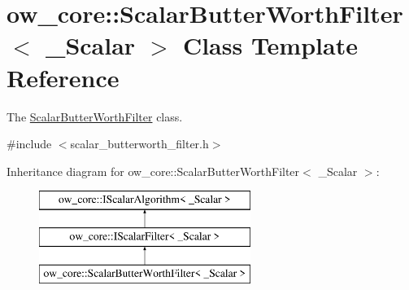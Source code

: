 \hypertarget{classow__core_1_1ScalarButterWorthFilter}{}\section{ow\+\_\+core\+:\+:Scalar\+Butter\+Worth\+Filter$<$ \+\_\+\+Scalar $>$ Class Template Reference}
\label{classow__core_1_1ScalarButterWorthFilter}


The \hyperlink{classow__core_1_1ScalarButterWorthFilter}{Scalar\+Butter\+Worth\+Filter} class.  




{\ttfamily \#include $<$scalar\+\_\+butterworth\+\_\+filter.\+h$>$}

Inheritance diagram for ow\+\_\+core\+:\+:Scalar\+Butter\+Worth\+Filter$<$ \+\_\+\+Scalar $>$\+:\begin{figure}[H]
\begin{center}
\leavevmode
\includegraphics[height=3.000000cm]{de/d75/classow__core_1_1ScalarButterWorthFilter}
\end{center}
\end{figure}
